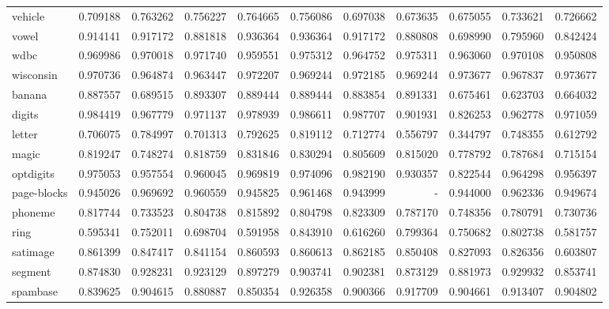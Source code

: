 \begin{tabular}{lrrrrrrrrrr}
vehicle         &   0.709188 &  0.763262 &  0.756227 &  0.764665 &  0.756086 &  0.697038 &  0.673635 &  0.675055 &  0.733621 &  0.726662 \\
vowel           &   0.914141 &  0.917172 &  0.881818 &  0.936364 &  0.936364 &  0.917172 &  0.880808 &  0.698990 &  0.795960 &  0.842424 \\
wdbc            &   0.969986 &  0.970018 &  0.971740 &  0.959551 &  0.975312 &  0.964752 &  0.975311 &  0.963060 &  0.970108 &  0.950808 \\
wisconsin       &   0.970736 &  0.964874 &  0.963447 &  0.972207 &  0.969244 &  0.972185 &  0.969244 &  0.973677 &  0.967837 &  0.973677 \\
banana          &   0.887557 &  0.689515 &  0.893307 &  0.889444 &  0.889444 &  0.883854 &  0.891331 &  0.675461 &  0.623703 &  0.664032 \\
digits          &   0.984419 &  0.967779 &  0.971137 &  0.978939 &  0.986611 &  0.987707 &  0.901931 &  0.826253 &  0.962778 &  0.971059 \\
letter          &   0.706075 &  0.784997 &  0.701313 &  0.792625 &  0.819112 &  0.712774 &  0.556797 &  0.344797 &  0.748355 &  0.612792 \\
magic           &   0.819247 &  0.748274 &  0.818759 &  0.831846 &  0.830294 &  0.805609 &  0.815020 &  0.778792 &  0.787684 &  0.715154 \\
optdigits       &   0.975053 &  0.957554 &  0.960045 &  0.969819 &  0.974096 &  0.982190 &  0.930357 &  0.822544 &  0.964298 &  0.956397 \\
page-blocks     &   0.945026 &  0.969692 &  0.960559 &  0.945825 &  0.961468 &  0.943999 &       - &  0.944000 &  0.962336 &  0.949674 \\
phoneme         &   0.817744 &  0.733523 &  0.804738 &  0.815892 &  0.804798 &  0.823309 &  0.787170 &  0.748356 &  0.780791 &  0.730736 \\
ring            &   0.595341 &  0.752011 &  0.698704 &  0.591958 &  0.843910 &  0.616260 &  0.799364 &  0.750682 &  0.802738 &  0.581757 \\
satimage        &   0.861399 &  0.847417 &  0.841154 &  0.860593 &  0.860613 &  0.862185 &  0.850408 &  0.827093 &  0.826356 &  0.603807 \\
segment         &   0.874830 &  0.928231 &  0.923129 &  0.897279 &  0.903741 &  0.902381 &  0.873129 &  0.881973 &  0.929932 &  0.853741 \\
spambase        &   0.839625 &  0.904615 &  0.880887 &  0.850354 &  0.926358 &  0.900366 &  0.917709 &  0.904661 &  0.913407 &  0.904802 \\

\end{tabular}
